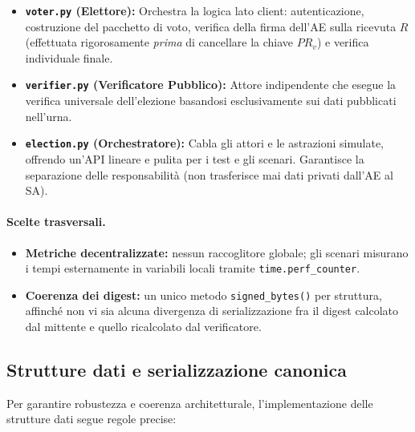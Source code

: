 \begin{itemize}
  \item \textbf{\texttt{voter.py} (Elettore):} Orchestra la logica lato client: autenticazione, costruzione del pacchetto di voto, verifica della firma dell'AE sulla ricevuta $R$ (effettuata rigorosamente \emph{prima} di cancellare la chiave $PR_v$) e verifica individuale finale.
  
  \item \textbf{\texttt{verifier.py} (Verificatore Pubblico):} Attore indipendente che esegue la verifica universale dell'elezione basandosi esclusivamente sui dati pubblicati nell'urna.
  
  \item \textbf{\texttt{election.py} (Orchestratore):} Cabla gli attori e le astrazioni simulate, offrendo un'API lineare e pulita per i test e gli scenari. Garantisce la separazione delle responsabilità (non trasferisce mai dati privati dall'AE al SA).
\end{itemize}

\paragraph{Scelte trasversali.}
\begin{itemize}
  \item \textbf{Metriche decentralizzate:} nessun raccoglitore globale; gli scenari misurano i tempi esternamente in variabili locali tramite \texttt{time.perf\_counter}.
  \item \textbf{Coerenza dei digest:} un unico metodo \texttt{signed\_bytes()} per struttura, affinché non vi sia alcuna divergenza di serializzazione fra il digest calcolato dal mittente e quello ricalcolato dal verificatore.
\end{itemize}

\subsection{Strutture dati e serializzazione canonica}
\label{subsec:wp4_strutture}

Per garantire robustezza e coerenza architetturale, l'implementazione delle strutture dati segue regole precise:

